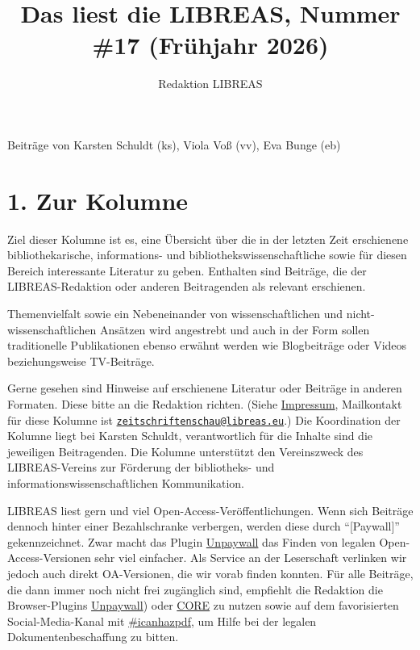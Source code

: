 \documentclass[a4paper,
fontsize=11pt,
oneside,
numbers=noperiodatend,
parskip=half-,
bibliography=totoc,
final
]{scrartcl}
\title{\LARGE{Das liest die LIBREAS, Nummer \#17 (Frühjahr 2026)}}%
\author{Redaktion LIBREAS} %
\date{}
\begin{document}
\maketitle
\thispagestyle{fancyplain} 


Beiträge von Karsten Schuldt (ks), Viola Voß (vv), Eva Bunge (eb)

\section{1. Zur Kolumne}\label{zur-kolumne}

Ziel dieser Kolumne ist es, eine Übersicht über die in der letzten Zeit
erschienene bibliothekarische, informations- und
bibliothekswissenschaftliche sowie für diesen Bereich interessante
Literatur zu geben. Enthalten sind Beiträge, die der LIBREAS-Redaktion
oder anderen Beitragenden als relevant erschienen.

Themenvielfalt sowie ein Nebeneinander von wissenschaftlichen und
nicht-wissenschaftlichen Ansätzen wird angestrebt und auch in der Form
sollen traditionelle Publikationen ebenso erwähnt werden wie
Blogbeiträge oder Videos beziehungsweise TV-Beiträge.

Gerne gesehen sind Hinweise auf erschienene Literatur oder Beiträge in
anderen Formaten. Diese bitte an die Redaktion richten. (Siehe
\href{http://libreas.eu/about/}{Impressum}, Mailkontakt für diese
Kolumne ist
\href{mailto:zeitschriftenschau@libreas.eu}{\nolinkurl{zeitschriftenschau@libreas.eu}}.)
Die Koordination der Kolumne liegt bei Karsten Schuldt, verantwortlich
für die Inhalte sind die jeweiligen Beitragenden. Die Kolumne
unterstützt den Vereinszweck des LIBREAS-Vereins zur Förderung der
bibliotheks- und informationswissenschaftlichen Kommunikation.

LIBREAS liest gern und viel Open-Access-Veröffentlichungen. Wenn sich
Beiträge dennoch hinter einer Bezahlschranke verbergen, werden diese
durch \enquote{{[}Paywall{]}} gekennzeichnet. Zwar macht das Plugin
\href{http://unpaywall.org/}{Unpaywall} das Finden von legalen
Open-Access-Versionen sehr viel einfacher. Als Service an der
Leserschaft verlinken wir jedoch auch direkt OA-Versionen, die wir vorab
finden konnten. Für alle Beiträge, die dann immer noch nicht frei
zugänglich sind, empfiehlt die Redaktion die Browser-Plugins
\href{http://unpaywall.org/}{Unpaywall}) oder
\href{https://core.ac.uk/services/discovery/}{CORE} zu nutzen sowie auf
dem favorisierten Social-Media-Kanal mit
\href{https://mastodon.social/tags/icanhazpdf}{\#icanhazpdf}, um Hilfe
bei der legalen Dokumentenbeschaffung zu bitten.
\end{document}
